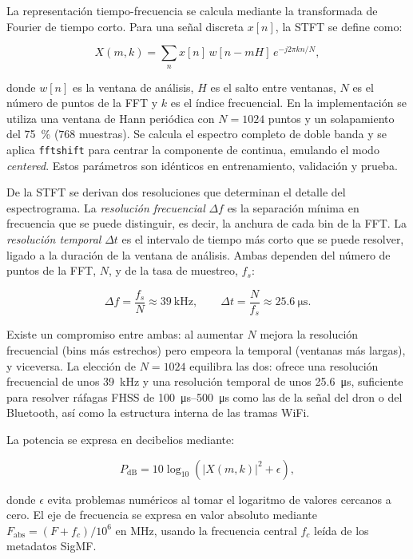 La representación tiempo-frecuencia se calcula mediante la transformada de Fourier de tiempo corto. Para una señal discreta $x[n]$, la STFT se define como:

\begin{equation}
X(m,k)=\sum_n x[n]\,w[n-mH]\,e^{-j2\pi kn/N},
\end{equation}

donde $w[n]$ es la ventana de análisis, $H$ es el salto entre ventanas, $N$ es el número de puntos de la FFT y $k$ es el índice frecuencial. En la implementación se utiliza una ventana de Hann periódica con $N = \num{1024}$ puntos y un solapamiento del \SI{75}{\percent} ($\num{768}$ muestras). Se calcula el espectro completo de doble banda y se aplica \texttt{fftshift} para centrar la componente de continua, emulando el modo \emph{centered}. Estos parámetros son idénticos en entrenamiento, validación y prueba.

De la STFT se derivan dos resoluciones que determinan el detalle del espectrograma. La \emph{resolución frecuencial} $\Delta f$ es la separación mínima en frecuencia que se puede distinguir, es decir, la anchura de cada bin de la FFT. La \emph{resolución temporal} $\Delta t$ es el intervalo de tiempo más corto que se puede resolver, ligado a la duración de la ventana de análisis. Ambas dependen del número de puntos de la FFT, $N$, y de la tasa de muestreo, $f_s$:

\begin{equation}
\Delta f = \frac{f_s}{N} \approx \SI{39}{\kilo\hertz}, \qquad
\Delta t = \frac{N}{f_s} \approx \SI{25.6}{\micro\second}.
\end{equation}

Existe un compromiso entre ambas: al aumentar $N$ mejora la resolución frecuencial (bins más estrechos) pero empeora la temporal (ventanas más largas), y viceversa. La elección de $N = \num{1024}$ equilibra las dos: ofrece una resolución frecuencial de unos \SI{39}{\kilo\hertz} y una resolución temporal de unos \SI{25.6}{\micro\second}, suficiente para resolver ráfagas FHSS de \SIrange{100}{500}{\micro\second} como las de la señal del dron o del Bluetooth, así como la estructura interna de las tramas WiFi.

La potencia se expresa en decibelios mediante:

\begin{equation}
P_{\mathrm{dB}} = 10\log_{10}\left(|X(m,k)|^2 + \epsilon\right),
\end{equation}

donde $\epsilon$ evita problemas numéricos al tomar el logaritmo de valores cercanos a cero. El eje de frecuencia se expresa en valor absoluto mediante $F_{\mathrm{abs}} = (F + f_c)/10^6$ en MHz, usando la frecuencia central $f_c$ leída de los metadatos SigMF.


